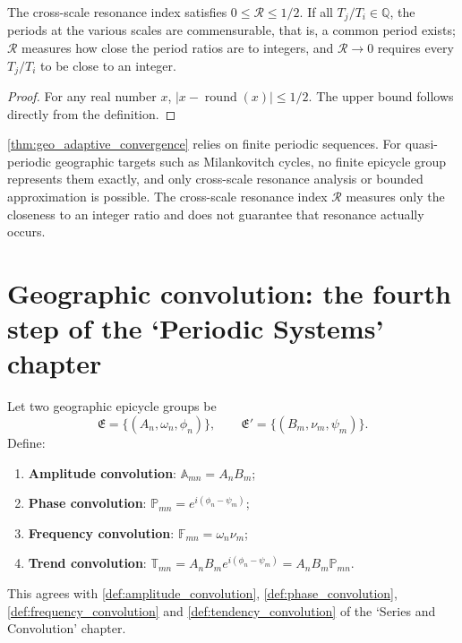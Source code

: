 \begin{proposition}\label{prop:geo_cross_scale_bound}
The cross-scale resonance index satisfies $0\le\mathcal R\le 1/2$. If all $T_j/T_i\in\mathbb Q$, the periods at the various scales are commensurable, that is, a common period exists; $\mathcal R$ measures how close the period ratios are to integers, and $\mathcal R\to0$ requires every $T_j/T_i$ to be close to an integer.
\end{proposition}

\begin{proof}
For any real number $x$, $|x-\operatorname{round}(x)|\le 1/2$. The upper bound follows directly from the definition.
\end{proof}

\begin{remark}\label{rem:geo_adaptive_boundary}
\cref{thm:geo_adaptive_convergence} relies on finite periodic sequences. For quasi-periodic geographic targets such as Milankovitch cycles, no finite epicycle group represents them exactly, and only cross-scale resonance analysis or bounded approximation is possible. The cross-scale resonance index $\mathcal R$ measures only the closeness to an integer ratio and does not guarantee that resonance actually occurs.
\end{remark}

\section{Geographic convolution: the fourth step of the `Periodic Systems' chapter}
\label{sec:geo_convolution}

\begin{definition}\label{def:geo_convolution_types}
Let two geographic epicycle groups be
\[
\mathfrak E=\{(A_n,\omega_n,\phi_n)\},\qquad
\mathfrak E'=\{(B_m,\nu_m,\psi_m)\}.
\]
Define:
\begin{enumerate}[label=(\roman*)]
    \item \textbf{Amplitude convolution}: $\mathbb A_{mn}=A_nB_m$;
    \item \textbf{Phase convolution}: $\mathbb P_{mn}=e^{i(\phi_n-\psi_m)}$;
    \item \textbf{Frequency convolution}: $\mathbb F_{mn}=\omega_n\nu_m$;
    \item \textbf{Trend convolution}: $\mathbb T_{mn}=A_nB_m e^{i(\phi_n-\psi_m)}=A_nB_m\mathbb P_{mn}$.
\end{enumerate}
This agrees with \cref{def:amplitude_convolution}, \cref{def:phase_convolution}, \cref{def:frequency_convolution} and \cref{def:tendency_convolution} of the `Series and Convolution' chapter.
\end{definition}

